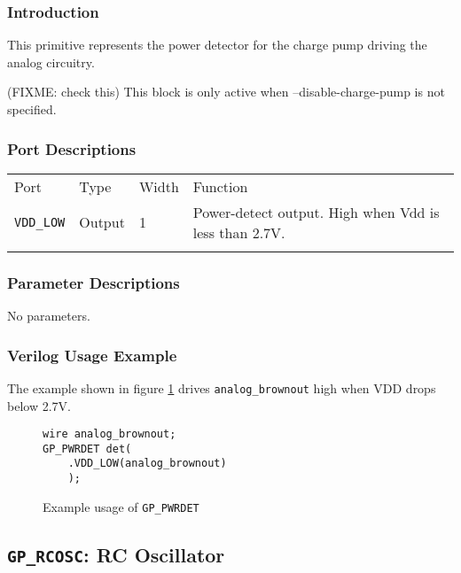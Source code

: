 \documentclass[11pt]{article}
\newcommand{\tokenstyle}[1]{\texttt{#1}}
\newcommand{\whenstyle}[1]{{\fontseries{sb}\selectfont#1}}
\newcommand{\thinhline}{\Xhline{1\arrayrulewidth}}
\newcommand{\thickhline}{\Xhline{2.5\arrayrulewidth}}
\begin{document}
\subsubsection{Introduction}
This primitive represents the power detector for the charge pump driving the analog circuitry.

(FIXME: check this) This block is only active when --disable-charge-pump is not specified.

\subsubsection{Port Descriptions}

\begin{tabularx}{\textwidth}{lllX}
\thinhline
\whenstyle{Port} & \whenstyle{Type} & \whenstyle{Width} & \whenstyle{Function} \\
\thickhline
\tokenstyle{VDD\_LOW} & Output & 1 & Power-detect output. High when Vdd is less than 2.7V.\\
\thinhline
\end{tabularx}

\subsubsection{Parameter Descriptions}

No parameters.

\subsubsection{Verilog Usage Example}

The example shown in figure \ref{gp-pwrdet-example} drives \tokenstyle{analog\_brownout} high when VDD drops below 2.7V.

\begin{figure}[h]
\begin{lstlisting}
wire analog_brownout;
GP_PWRDET det(
	.VDD_LOW(analog_brownout)
	);
\end{lstlisting}
\caption{Example usage of \tokenstyle{GP\_PWRDET}}
\label{gp-pwrdet-example}
\end{figure}


\pagebreak
\subsection{\tokenstyle{GP\_RCOSC}: RC Oscillator}
\label{gp-rcosc}
\end{document}
